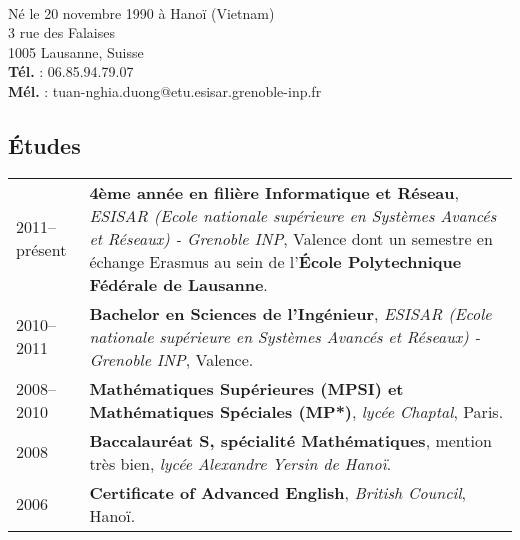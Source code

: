 \documentclass[11pt,a4paper]{article}
\begin{document}
\pagestyle{empty}


\newlength{\annee}
\settowidth{\annee}{Janvier--février}


\newlength{\texte}
\setlength{\texte}{\textwidth} \addtolength{\texte}{-\annee} 
	\addtolength{\texte}{-2\tabcolsep}


 \\
Né le 20 novembre 1990 à Hanoï (Vietnam) \\
3 rue des Falaises\\
1005 Lausanne, Suisse\\
\textbf{Tél.} : 06.85.94.79.07\\
\textbf{Mél.} : tuan-nghia.duong@etu.esisar.grenoble-inp.fr\\


\subsection*{Études}
\noindent \begin{tabular}{@{}p{\annee}p{\texte}@{}}

2011--présent & \textbf{4ème année en filière Informatique et Réseau}, \textit{ESISAR (Ecole nationale supérieure en Systèmes Avancés et Réseaux) - Grenoble INP}, Valence dont un semestre en échange Erasmus au sein de l'\textbf{École Polytechnique Fédérale de Lausanne}.\\
2010--2011 & \textbf{Bachelor en Sciences de l'Ingénieur}, \textit{ESISAR (Ecole nationale supérieure en Systèmes Avancés et Réseaux) - Grenoble INP}, Valence.\\
2008--2010 & \textbf{Mathématiques Supérieures (MPSI) et Mathématiques Spéciales (MP*)}, \textit{lycée
Chaptal}, Paris. \\
2008 & \textbf{Baccalauréat S, spécialité Mathématiques}, mention 
très bien, \textit{lycée Alexandre Yersin de Hanoï}. \\
2006 & \textbf{Certificate of Advanced English}, \textit{British Council}, Hanoï.\\
\end{tabular}
\end{document}
